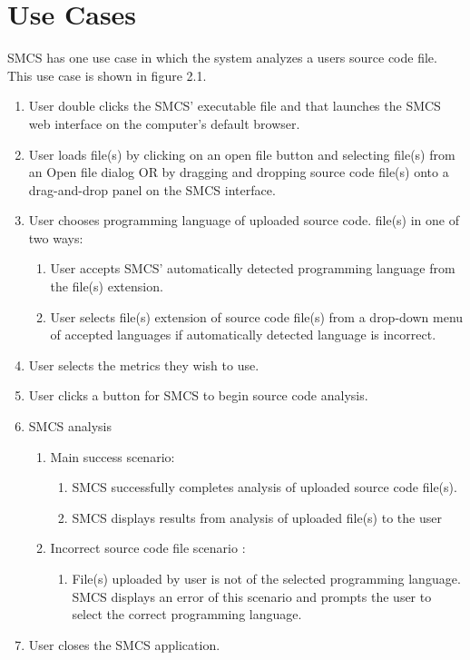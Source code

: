 \documentclass{scrreprt}
\begin{document}
	\section{Use Cases}
	SMCS has one use case in which the system analyzes a users source code file. This use case is shown in figure 2.1.
	\pagestyle{plain}
	\begin{enumerate}
		\item User double clicks the SMCS’ executable file and that launches the SMCS web interface on the computer’s default browser.
		\item User loads file(s) by clicking on an open file button and selecting file(s) from an Open file dialog OR by dragging and dropping source code file(s) onto a drag-and-drop panel on the SMCS interface.
		\item User chooses programming language of uploaded source code. file(s) in one of two ways:
		\begin{enumerate}
			\item User accepts SMCS’ automatically detected programming language from the file(s) extension.
			\item User selects file(s) extension of source code file(s) from a drop-down menu of accepted languages if automatically detected language is incorrect.
		\end{enumerate}
		\item User selects the metrics they wish to use.
		\item User clicks a button for SMCS to begin source code analysis.
		\item SMCS analysis
		\begin{enumerate}
			\item Main success scenario:
			\begin{enumerate}
				\item SMCS successfully completes analysis of uploaded source code file(s).
				\item SMCS displays results from analysis of uploaded file(s) to the user
			\end{enumerate}
			\item Incorrect source code file scenario :
			\begin{enumerate}
				\item File(s) uploaded by user is not of the selected programming language. SMCS displays an error of this scenario and prompts the user to select the correct programming language.
			\end{enumerate}
		\end{enumerate}
		\item User closes the SMCS application.
	\end{enumerate}
\end{document}
